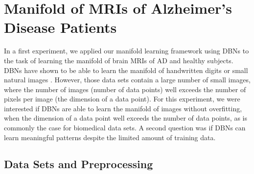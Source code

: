 
\section[Manifold of MRIs of Alzheimer's disease patients]{Manifold of MRIs of
Alzheimer's Disease Patients}


In a first experiment, we applied our manifold learning framework using DBNs to
the task of learning the manifold of brain MRIs of AD and healthy subjects. DBNs
have shown to be able to learn the manifold of handwritten digits
\citep{hinton2006b} or small natural images \citep{krizhevsky2010}. However,
those data sets contain a large number of small images, where the number of
images (number of data points) well exceeds the number of pixels per image (the
dimension of a data point). For this experiment, we were interested if DBNs are
able to learn the manifold of images without overfitting, when the dimension of
a data point well exceeds the number of data points, as is commonly the case for
biomedical data sets. A second question was if DBNs can learn meaningful
patterns despite the limited amount of training data.


\subsection[Data sets and preprocessing]{Data Sets and Preprocessing}


